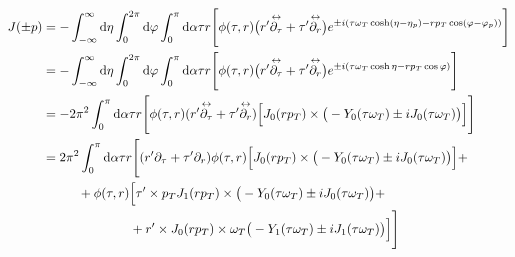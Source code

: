 \begin{subequations}
    \begin{align}
        J(\pm p) & =-\int_{-\infty}^\infty\text{d}\eta\int_0^{2\pi}\text{d}\varphi\int_0^\pi\text{d}\alpha\tau r\Bigg[\phi(\tau,r)\big(r^\prime\overset{\leftrightarrow}{\partial_\tau}+\tau^\prime\overset{\leftrightarrow}{\partial_r}\big)e^{\pm{i}(\tau \omega_T\cosh(\eta-\eta_p)-r p_T\cos(\varphi-\varphi_p))}\Bigg] \\
                           & =-\int_{-\infty}^\infty\text{d}\eta\int_0^{2\pi}\text{d}\varphi\int_0^\pi\text{d}\alpha\tau r\Bigg[\phi(\tau,r)\big(r^\prime\overset{\leftrightarrow}{\partial_\tau}+\tau^\prime\overset{\leftrightarrow}{\partial_r}\big)e^{\pm{i}(\tau \omega_T\cosh\eta-r p_T\cos\varphi)}\Bigg]                      \\
                           & =-2\pi^2\int_0^\pi\text{d}\alpha\tau r\Bigg[\phi(\tau,r)(r^\prime\overset{\leftrightarrow}{\partial_\tau}+\tau^\prime\overset{\leftrightarrow}{\partial_r})\Big[J_0(r p_T)\times\big(-Y_0(\tau\omega_T)\pm{i} J_0(\tau\omega_T)\big)\Big]\Bigg]                                                 \\
                           & =2\pi^2\int_0^\pi\text{d}\alpha\tau r\Bigg[(r^\prime\partial_\tau+\tau^\prime\partial_r)\phi(\tau,r)\Big[J_0(r p_T)\times\big(-Y_0(\tau\omega_T)\pm{i} J_0(\tau\omega_T)\big)\Big]+\nonumber                                                                                             \\
                           & \phantom{=}\qquad + \phi(\tau,r)\Big[\tau^\prime\times p_T J_1(r p_T)\times\big(-Y_0(\tau\omega_T)\pm{i} J_0(\tau\omega_T)\big)+\nonumber                                                                                                                                       \\
                           & \phantom{=}\qquad\phantom{+\phi(\tau,r)\Big[}+r^\prime\times J_0(r p_T)\times\omega_T\big(-Y_1(\tau\omega_T)\pm{i} J_1(\tau\omega_T)\big)\Big]\Bigg]
    \end{align}
\end{subequations}


